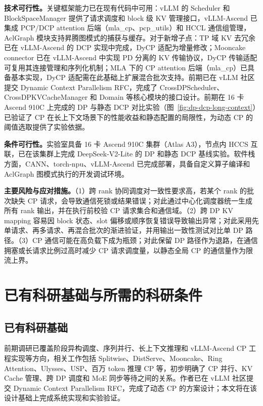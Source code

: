 \textbf{技术可行性。}关键框架能力已在现有代码中可用：vLLM 的 Scheduler 和 BlockSpaceManager 提供了请求调度和 block 级 KV 管理接口，vLLM-Ascend 已集成 PCP/DCP attention 后端（mla\_cp、pcp\_utils）和 HCCL 通信组管理，AclGraph 模块支持昇腾图模式的捕获与缓存。对于新增子点：TP 域 KV 去冗余已在 vLLM-Ascend 的 DCP 实现中完成，DyCP 适配为增量修改；Mooncake connector 已在 vLLM-Ascend 中实现 PD 分离的 KV 传输协议，DyCP 传输适配可复用其连接管理和序列化机制；MLA 下的 CP attention 后端（mla\_cp）已具备基本实现，DyCP 适配需在此基础上扩展混合批次支持。前期已在 vLLM 社区提交 Dynamic Context Parallelism RFC\citep{vllmdynamiccp2025}，完成了 CrossDPScheduler、CrossDPKVCacheManager 和 Domain 等核心模块的接口设计。前期在 16 卡 Ascend 910C 上完成的 DP 与静态 DCP 对比实验（图~\ref{fig:dp-dcp-long-context}）已验证了 CP 在长上下文场景下的性能收益和静态配置的局限性，为动态 CP 的阈值选取提供了实验依据。

\textbf{条件可行性。}实验室具备 16 卡 Ascend 910C 集群（Atlas A3），节点内 HCCS 互联，已在该集群上完成 DeepSeek-V2-Lite 的 DP 和静态 DCP 基线实验。软件栈方面，CANN、torch-npu、vLLM-Ascend 已完成部署，具备自定义算子编译和 AclGraph 图模式执行的开发调试环境。

\textbf{主要风险与应对措施。}（1）跨 rank 协同调度对一致性要求高，若某个 rank 的批次缺失 CP 请求，会导致通信死锁或结果错误；对此通过中心化调度器统一生成所有 rank 输出，并在执行前校验 CP 请求集合和通信域。（2）跨 DP KV mapping 容易因 block 状态、slot 偏移或顺序恢复错误导致输出异常；对此采用先单请求、再多请求、再混合批次的渐进验证，并用输出一致性测试对比单 DP 路径。（3）CP 通信可能在高负载下成为瓶颈；对此保留 DP 路径作为退路，在通信拥塞或长请求比例过高时减少 CP 请求调度量，以静态全局 CP 的通信量作为限流上界。

\section{已有科研基础与所需的科研条件}

\subsection{已有科研基础}

前期调研已覆盖阶段异构调度、序列并行、长上下文推理和 vLLM-Ascend CP 工程实现等方向，相关工作包括 Splitwise、DistServe、Mooncake、Ring Attention、Ulysses、USP、百万 token 推理 CP 等，初步明确了 CP 并行、KV Cache 管理、跨 DP 调度和 MoE 同步等待之间的关系。作者已在 vLLM 社区提交 Dynamic Context Parallelism RFC\citep{vllmdynamiccp2025}，完成了动态 CP 的方案设计；本文将在该设计基础上完成系统实现和实验验证。

